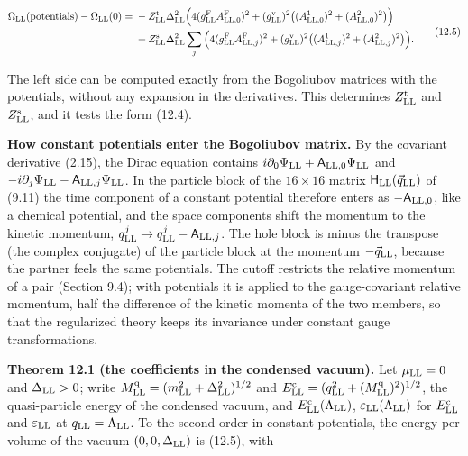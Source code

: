 \documentclass[
  10pt,
]{article}
\begin{document}
\[\begin{aligned}\Omega_{\rm LL}(\text{potentials})-\Omega_{\rm LL}(0)={}&-Z^{\rm t}_{\rm LL}\Delta_{\rm LL}^2\Big(4(g^{\rm F}_{\rm LL}A^{\rm F}_{{\rm LL},0})^2+(g^{\rm v}_{\rm LL})^2\big((A^1_{{\rm LL},0})^2+(A^2_{{\rm LL},0})^2\big)\Big)\\&+Z^{\rm s}_{\rm LL}\Delta_{\rm LL}^2\sum_j\Big(4(g^{\rm F}_{\rm LL}A^{\rm F}_{{\rm LL},j})^2+(g^{\rm v}_{\rm LL})^2\big((A^1_{{\rm LL},j})^2+(A^2_{{\rm LL},j})^2\big)\Big).\end{aligned}\tag{12.5}\]

The left side can be computed exactly from the Bogoliubov matrices with
the potentials, without any expansion in the derivatives. This
determines \(Z^{\rm t}_{\rm LL}\) and \(Z^{\rm s}_{\rm LL}\), and it
tests the form (12.4).

\textbf{How constant potentials enter the Bogoliubov matrix.} By the
covariant derivative (2.15), the Dirac equation contains
\(i\partial_0\Psi_{\rm LL}+\mathsf A_{{\rm LL},0}\Psi_{\rm LL}\) and
\(-i\partial_j\Psi_{\rm LL}-\mathsf A_{{\rm LL},j}\Psi_{\rm LL}\). In
the particle block of the \(16\times16\) matrix
\(\mathsf H_{\rm LL}(\vec q_{\rm LL})\) of (9.11) the time component of
a constant potential therefore enters as \(-\mathsf A_{{\rm LL},0}\),
like a chemical potential, and the space components shift the momentum
to the kinetic momentum,
\(q^j_{\rm LL}\to q^j_{\rm LL}-\mathsf A_{{\rm LL},j}\). The hole block
is minus the transpose (the complex conjugate) of the particle block at
the momentum \(-\vec q_{\rm LL}\), because the partner feels the same
potentials. The cutoff restricts the relative momentum of a pair
(Section 9.4); with potentials it is applied to the gauge-covariant
relative momentum, half the difference of the kinetic momenta of the two
members, so that the regularized theory keeps its invariance under
constant gauge transformations.

\textbf{Theorem 12.1 (the coefficients in the condensed vacuum).} Let
\(\mu_{\rm LL}=0\) and \(\Delta_{\rm LL}>0\); write
\(M^{\rm q}_{\rm LL}=(m_{\rm LL}^2+\Delta_{\rm LL}^2)^{1/2}\) and
\(E^{\rm c}_{\rm LL}=(q_{\rm LL}^2+(M^{\rm q}_{\rm LL})^2)^{1/2}\), the
quasi-particle energy of the condensed vacuum, and
\(E^{\rm c}_{\rm LL}(\Lambda_{\rm LL})\),
\(\varepsilon_{\rm LL}(\Lambda_{\rm LL})\) for \(E^{\rm c}_{\rm LL}\)
and \(\varepsilon_{\rm LL}\) at \(q_{\rm LL}=\Lambda_{\rm LL}\). To the
second order in constant potentials, the energy per volume of the vacuum
\((0,0,\Delta_{\rm LL})\) is (12.5), with
\end{document}
